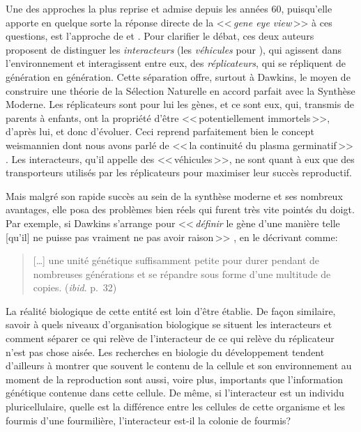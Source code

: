 Une des approches la plus reprise et admise depuis les années 60, puisqu'elle apporte en quelque sorte la réponse directe de la <<\,\emph{gene eye view}\,>> à ces questions, est l'approche de \cite{dawkins76selfishgene} et \cite{hull1974philosophyofbiologicalscience}. Pour clarifier le débat, ces deux auteurs proposent de distinguer les \emph{interacteurs} (les \emph{véhicules} pour \cite{dawkins76selfishgene}), qui agissent dans l'environnement et interagissent entre eux, des \emph{réplicateurs}, qui se répliquent de génération en génération. Cette séparation offre, surtout à Dawkins, le moyen de construire une théorie de la Sélection Naturelle en accord parfait avec la Synthèse Moderne. Les réplicateurs sont pour lui les gènes, et ce sont eux, qui, transmis de parents à enfants, ont la propriété d'être  <<\,potentiellement immortels\,>>, d'après lui, et donc d'évoluer. Ceci reprend parfaitement bien le concept weismannien dont nous avons parlé de <<\,la continuité du plasma germinatif\,>> \citep[p.~11]{dawkins76selfishgene}. Les interacteurs, qu'il appelle des <<\,véhicules\,>>, ne sont quant à eux que des transporteurs utilisés par les réplicateurs pour maximiser leur succès reproductif.

Mais malgré son rapide succès au sein de la synthèse moderne et ses nombreux avantages, elle posa des problèmes bien réels qui furent très vite pointés du doigt. Par exemple, si Dawkins s'arrange pour <<\,\emph{définir} le gène d'une manière telle [qu'il] ne puisse pas vraiment ne pas avoir raison\,>> \citet[p.~33, emphase d'origine]{dawkins76selfishgene}, en le décrivant comme:
\begin{quote}
	[\ldots] une unité génétique suffisamment petite pour durer pendant de nombreuses générations et se répandre sous forme d'une multitude de copies.
	(\emph{ibid}. p.~32)
\end{quote}
La réalité biologique de cette entité est loin d'être établie. De façon similaire, savoir à quels niveaux d'organisation biologique se situent les interacteurs et comment séparer ce qui relève de l'interacteur de ce qui relève du réplicateur n'est pas chose aisée. Les recherches en biologie du développement tendent d'ailleurs à montrer que souvent le contenu de la cellule et son environnement au moment de la reproduction sont aussi, voire plus, importants que l'information génétique contenue dans cette cellule. De même, si l'interacteur est un individu pluricellulaire, quelle est la différence entre les cellules de cette organisme et les fourmis d'une fourmilière, l'interacteur est-il la colonie de fourmis? 

